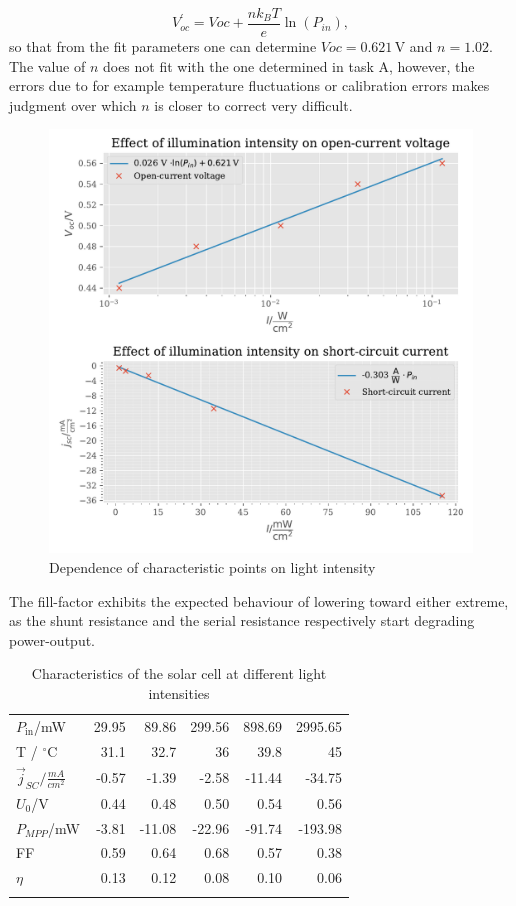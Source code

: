 \documentclass[english,  %
parskip=full,  %
headsepline]{scrartcl}
\begin{document}
\[
V^\prime_{oc}=V{oc}+\frac{nk_BT}{e}\ln(P_{in}),
\]
so that from the fit parameters one can determine $V{oc}=0.621$\,V and $n=1.02$. The value of $n$ does not fit with the one determined in task A, however, the errors due to for example temperature fluctuations or calibration errors makes judgment over which $n$ is closer to correct very difficult.\\
\begin{figure}[H]
    \centering
    \includegraphics[width=\linewidth]{B_plot.pdf}
    \caption{Dependence of characteristic points on light intensity}
    \label{fig:B_plot}
\end{figure}
The fill-factor exhibits the expected behaviour of lowering toward either extreme, as the shunt resistance and the serial resistance respectively start degrading power-output.
\begin{table}[H]
\centering
    \caption{Characteristics of the solar cell at different light intensities}
\begin{tabular}{lrrrrr}
\toprule
{$P_\mathrm{in}$/mW} &  29.95   &  89.86   &  299.56  &  898.69  &  2995.65 \\
T / $^\circ$C & 31.1 & 32.7 & 36 & 39.8 & 45\\
\midrule
$\Vec{j}_{SC}/\si{\frac{mA}{cm^2}}$ &    -0.57 &    -1.39 &    -2.58 &   -11.44 &   -34.75 \\
$U_0$/V &     0.44 &     0.48 &     0.50 &     0.54 &     0.56 \\
$P_{MPP}$/mW &    -3.81 &   -11.08 &   -22.96 &   -91.74 &  -193.98 \\
FF &     0.59 &     0.64 &     0.68 &     0.57 &     0.38 \\
$\eta$ &     0.13&     0.12 &     0.08 &     0.10 &     0.06 \\
\bottomrule
\label{tab:illumination}
\end{tabular}
\end{table}
\end{document}
